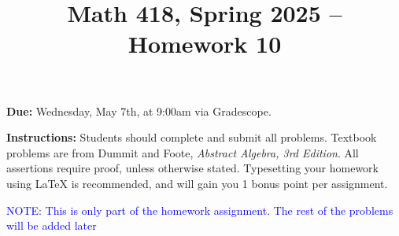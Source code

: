 \documentclass[12pt]{article}
\title{Math 418, Spring 2025 -- Homework 10}
\date{}
\begin{document}
 \maketitle
\vspace{-80pt}

\textbf{Due:} Wednesday, May 7th, at 9:00am via Gradescope.

\textbf{Instructions:} Students should complete and submit all problems. Textbook problems are from Dummit and Foote, \emph{Abstract Algebra, 3rd Edition}. All assertions require proof, unless otherwise stated. Typesetting your homework using LaTeX is recommended, and will gain you 1 bonus point per assignment.

\textcolor{blue}{NOTE: This is only part of the homework assignment. The rest of the problems will be added later}
\end{document}
